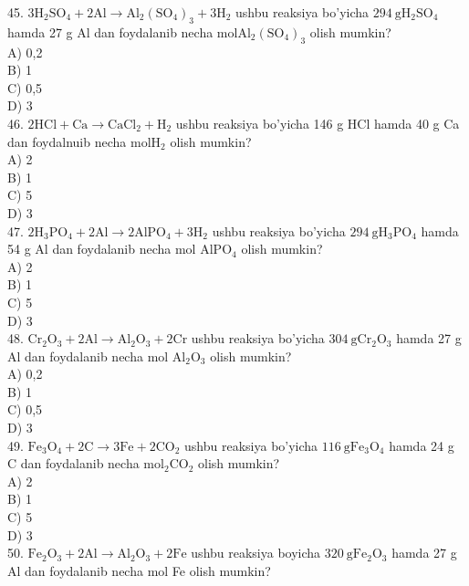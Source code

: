 45. $3 \mathrm{H}_{2} \mathrm{SO}_{4}+2 \mathrm{Al} \rightarrow \mathrm{Al}_{2}\left(\mathrm{SO}_{4}\right)_{3}+3 \mathrm{H}_{2}$ ushbu reaksiya bo'yicha $294 \mathrm{~g} \mathrm{H}_{2} \mathrm{SO}_{4}$ hamda 27 g Al dan foydalanib necha $\mathrm{mol} \mathrm{Al}_{2}\left(\mathrm{SO}_{4}\right)_{3}$ olish mumkin?\\
A) 0,2\\
B) 1\\
C) 0,5\\
D) 3\\
46. $2 \mathrm{HCl}+\mathrm{Ca} \rightarrow \mathrm{CaCl}_{2}+\mathrm{H}_{2}$ ushbu reaksiya bo'yicha 146 g HCl hamda 40 g Ca dan foydalnuib necha $\mathrm{mol} \mathrm{H}_{2}$ olish mumkin?\\
A) 2\\
B) 1\\
C) 5\\
D) 3\\
47. $2 \mathrm{H}_{3} \mathrm{PO}_{4}+2 \mathrm{Al} \rightarrow 2 \mathrm{AlPO}_{4}+3 \mathrm{H}_{2}$ ushbu reaksiya bo'yicha $294 \mathrm{~g} \mathrm{H}_{3} \mathrm{PO}_{4}$ hamda 54 g Al dan foydalanib necha mol $\mathrm{AlPO}_{4}$ olish mumkin?\\
A) 2\\
B) 1\\
C) 5\\
D) 3\\
48. $\mathrm{Cr}_{2} \mathrm{O}_{3}+2 \mathrm{Al} \rightarrow \mathrm{Al}_{2} \mathrm{O}_{3}+2 \mathrm{Cr}$ ushbu reaksiya bo'yicha $304 \mathrm{~g} \mathrm{Cr}_{2} \mathrm{O}_{3}$ hamda 27 g Al dan foydalanib necha mol $\mathrm{Al}_{2} \mathrm{O}_{3}$ olish mumkin?\\
A) 0,2\\
B) 1\\
C) 0,5\\
D) 3\\
49. $\mathrm{Fe}_{3} \mathrm{O}_{4}+2 \mathrm{C} \rightarrow 3 \mathrm{Fe}+2 \mathrm{CO}_{2}$ ushbu reaksiya bo'yicha $116 \mathrm{~g} \mathrm{Fe}_{3} \mathrm{O}_{4}$ hamda 24 g C dan foydalanib necha $\mathrm{mol}_{2} \mathrm{CO}_{2}$ olish mumkin?\\
A) 2\\
B) 1\\
C) 5\\
D) 3\\
50. $\mathrm{Fe}_{2} \mathrm{O}_{3}+2 \mathrm{Al} \rightarrow \mathrm{Al}_{2} \mathrm{O}_{3}+2 \mathrm{Fe}$ ushbu reaksiya boyicha $320 \mathrm{~g} \mathrm{Fe}_{2} \mathrm{O}_{3}$ hamda 27 g Al dan foydalanib necha mol Fe olish mumkin?\\
